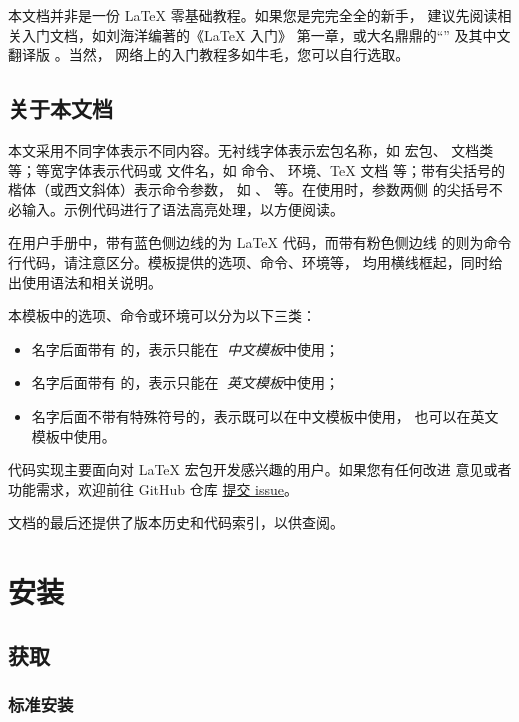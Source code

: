 \documentclass{fdudoc}
\begin{document}
本文档并非是一份 \LaTeX{} 零基础教程。如果您是完完全全的新手，
建议先阅读相关入门文档，如刘海洋编著的《\LaTeX{} 入门》
 第一章，或大名鼎鼎的“”
 及其中文翻译版 。当然，
网络上的入门教程多如牛毛，您可以自行选取。

\subsection*{关于本文档}

本文采用不同字体表示不同内容。无衬线字体表示宏包名称，如
 宏包、 文档类等；等宽字体表示代码或
文件名，如  命令、 环境、\TeX{} 文档
 等；带有尖括号的楷体（或西文斜体）表示命令参数，
如 、 等。在使用时，参数两侧
的尖括号不必输入。示例代码进行了语法高亮处理，以方便阅读。

在用户手册中，带有蓝色侧边线的为 \LaTeX{} 代码，而带有粉色侧边线
的则为命令行代码，请注意区分。模板提供的选项、命令、环境等，
均用横线框起，同时给出使用语法和相关说明。

本模板中的选项、命令或环境可以分为以下三类：
\begin{itemize}
  \item 名字后面带有 \rexptarget\rexpstar{} 的，表示只能在^^A
    \emph{中文模板}中使用；
  \item 名字后面带有 \exptarget\expstar{} 的，表示只能在^^A
    \emph{英文模板}中使用；
  \item 名字后面不带有特殊符号的，表示既可以在中文模板中使用，
    也可以在英文模板中使用。
\end{itemize}

代码实现主要面向对 \LaTeX{} 宏包开发感兴趣的用户。如果您有任何改进
意见或者功能需求，欢迎前往 GitHub 仓库
\href{https://github.com/stone-zeng/fduthesis/issues}{提交 issue}。

文档的最后还提供了版本历史和代码索引，以供查阅。

\section{安装}

\subsection{获取 }

\subsubsection{标准安装}
\end{document}

